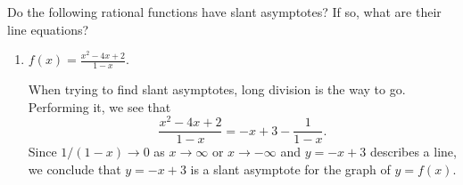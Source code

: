 \documentclass{ximera}
\begin{document}
\begin{example} Do the following rational functions have slant asymptotes? If so, what are their line equations?
  \begin{enumerate}
  \item $f(x) = \frac{x^2-4x+2}{1-x}$. \\[1em]
    \begin{explanation}
      When trying to find slant asymptotes, long division is the way to go. Performing it, we see that \[    \frac{x^2-4x+2}{1-x} = -x+3 - \frac{1}{1-x}.  \]Since $1/(1-x) \to 0$ as $x \to \infty$ or $x \to -\infty$ and $y=-x+3$ describes a line, we conclude that $y=-x+3$ is a slant asymptote for the graph of $y=f(x)$.
  \begin{image}
 \end{image}
    \end{explanation}
    

\end{enumerate}
\end{example}
\end{document}
